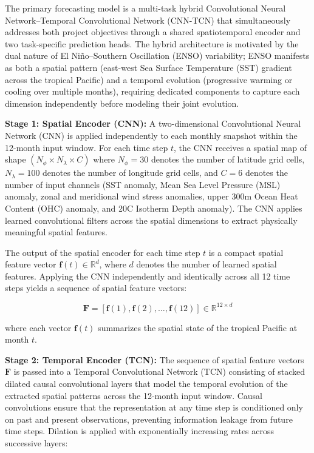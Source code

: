 The primary forecasting model is a multi-task hybrid Convolutional Neural Network--Temporal Convolutional Network (CNN-TCN) that simultaneously addresses both project objectives through a shared spatiotemporal encoder and two task-specific prediction heads. The hybrid architecture is motivated by the dual nature of El Ni\~{n}o--Southern Oscillation (ENSO) variability; ENSO manifests as both a spatial pattern (east-west Sea Surface Temperature (SST) gradient across the tropical Pacific) and a temporal evolution (progressive warming or cooling over multiple months), requiring dedicated components to capture each dimension independently before modeling their joint evolution.

\textbf{Stage 1: Spatial Encoder (CNN):}
A two-dimensional Convolutional Neural Network (CNN) is applied independently to each monthly snapshot within the 12-month input window. For each time step $t$, the CNN receives a spatial map of shape $(N_{\phi} \times N_{\lambda} \times C)$ where $N_{\phi} = 30$ denotes the number of latitude grid cells, $N_{\lambda} = 100$ denotes the number of longitude grid cells, and $C = 6$ denotes the number of input channels (SST anomaly, Mean Sea Level Pressure (MSL) anomaly, zonal and meridional wind stress anomalies, upper 300m Ocean Heat Content (OHC) anomaly, and 20\degree C Isotherm Depth anomaly). The CNN applies learned convolutional filters across the spatial dimensions to extract physically meaningful spatial features.

The output of the spatial encoder for each time step $t$ is a compact spatial feature vector $\mathbf{f}(t) \in \mathbb{R}^{d}$, where $d$ denotes the number of learned spatial features. Applying the CNN independently and identically across all 12 time steps yields a sequence of spatial feature vectors:

\begin{equation}
\mathbf{F} = \left[ \mathbf{f}(1), \mathbf{f}(2), \ldots, \mathbf{f}(12) \right] \in \mathbb{R}^{12 \times d}
\end{equation}

\noindent where each vector $\mathbf{f}(t)$ summarizes the spatial state of the tropical Pacific at month $t$.

\textbf{Stage 2: Temporal Encoder (TCN):}
The sequence of spatial feature vectors $\mathbf{F}$ is passed into a Temporal Convolutional Network (TCN) consisting of stacked dilated causal convolutional layers that model the temporal evolution of the extracted spatial patterns across the 12-month input window. Causal convolutions ensure that the representation at any time step is conditioned only on past and present observations, preventing information leakage from future time steps. Dilation is applied with exponentially increasing rates across successive layers:

